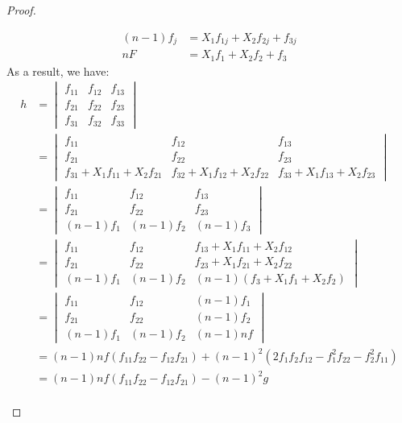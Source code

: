 \documentclass{solution}
\begin{document}
\begin{proof}
\begin{enumerate}
$$\begin{aligned}
            (n - 1)f_j &= X_1f_{1j} + X_2f_{2j} + f_{3j}\\
            n F &= X_1f_1 + X_2f_2 + f_3
            \end{aligned}
        $$
        As a result, we have:
        $$
            \begin{aligned}
            h &= \begin{vmatrix}
                f_{11} &f_{12} &f_{13} \\
                f_{21} &f_{22} &f_{23} \\
                f_{31} &f_{32} &f_{33}
            \end{vmatrix} \\
            &= \begin{vmatrix}
                f_{11} &f_{12} &f_{13} \\
                f_{21} &f_{22} &f_{23} \\
                f_{31} + X_1 f_{11} + X_2 f_{21} &f_{32} + X_1 f_{12} + X_2 f_{22} &f_{33} + X_1 f_{13} + X_2 f_{23}
            \end{vmatrix} \\
            &= \begin{vmatrix}
                f_{11} &f_{12} &f_{13} \\
                f_{21} &f_{22} &f_{23} \\
                (n - 1)f_{1} &(n - 1)f_2 &(n - 1) f_3
            \end{vmatrix} \\
            &= \begin{vmatrix}
                f_{11} &f_{12} &f_{13} + X_1 f_{11} + X_2 f_{12}\\
                f_{21} &f_{22} &f_{23} + X_1 f_{21} + X_2 f_{22}\\
                (n - 1)f_{1} &(n - 1)f_2 &(n - 1) (f_3 + X_1 f_1 + X_2f_2)
            \end{vmatrix} \\
            &= \begin{vmatrix}
                f_{11} &f_{12} &(n - 1)f_1 \\
                f_{21} &f_{22} &(n - 1)f_2 \\
                (n - 1)f_1 & (n - 1)f_2 &(n - 1)nf
            \end{vmatrix} \\
            &= (n - 1)n f (f_{11}f_{22} - f_{12}f_{21}) + (n - 1)^2(2f_1f_2f_{12} - f_1^2f_{22} - f_2^2f_{11}) \\
            &= (n - 1)n f (f_{11}f_{22} - f_{12}f_{21}) - (n - 1)^2g\\

\end{aligned}$$
\end{enumerate}
\end{proof}
\end{document}
